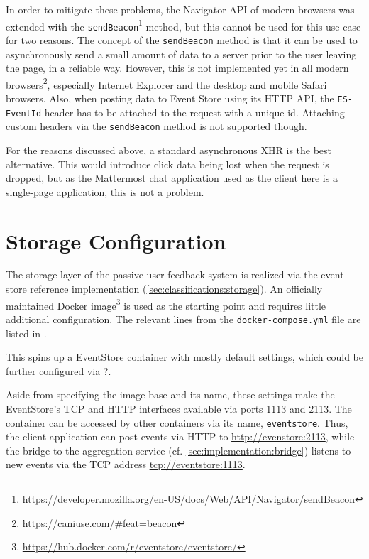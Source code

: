 In order to mitigate these problems, the Navigator \ac{API} of modern browsers was extended with the \texttt{sendBeacon}\footnote{\url{https://developer.mozilla.org/en-US/docs/Web/API/Navigator/sendBeacon}} method, but this cannot be used for this use case for two reasons.
The concept of the \texttt{sendBeacon} method is that it can be used to asynchronously send a small amount of data to a server prior to the user leaving the page, in a reliable way.
However, this is not implemented yet in all modern browsers\footnote{\url{https://caniuse.com/\#feat=beacon}}, especially Internet Explorer and the desktop and mobile Safari browsers.
Also, when posting data to Event Store using its \ac{HTTP} \ac{API}, the \texttt{ES-EventId} header has to be attached to the request with a unique id.
Attaching custom headers via the \texttt{sendBeacon} method is not supported though.

For the reasons discussed above, a standard asynchronous \ac{XHR} is the best alternative.
This would introduce click data being lost when the request is dropped, but as the Mattermost chat application used as the client here is a single-page application, this is not a problem.

\section{Storage Configuration}
\label{sec:implementation:storage}

The storage layer of the passive user feedback system is realized via the event store reference implementation (\cref{sec:classifications:storage}).
An officially maintained Docker image\footnote{\url{https://hub.docker.com/r/eventstore/eventstore/}} is used as the starting point and requires little additional configuration.
The relevant lines from the \texttt{docker-compose.yml} file are listed in .


This spins up a EventStore container with mostly default settings, which could be further configured via ?.

Aside from specifying the image base and its name, these settings make the EventStore's TCP and HTTP interfaces available via ports 1113 and 2113.
The container can be accessed by other containers via its name, \texttt{eventstore}.
Thus, the client application can post events via HTTP to \url{http://evenstore:2113}, while the bridge to the aggregation service (cf. \cref{sec:implementation:bridge}) listens to new events via the TCP address \url{tcp://eventstore:1113}.

